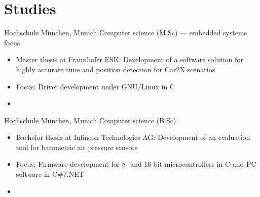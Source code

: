 \documentclass[%
               doublesided,
               paper=a4,
               fontsize=10pt
              ]{my-resume}
\begin{document}
{    \section[\faMortarBoard]{Studies}
        {Hochschule München, Munich}
        {Computer science (M.Sc) --- embedded systems focus}
        {\begin{itemize}
            \item Master thesis at Fraunhofer ESK: Development of a software solution for highly accurate time and position detection for Car2X scenarios
            \item Focus: Driver development under GNU/Linux in C
            \item[]  
        \end{itemize}}
    
        {Hochschule München, Munich}
        {Computer science (B.Sc)}
        {\begin{itemize}
            \item Bachelor thesis at Infineon Technologies AG: Development of an evaluation tool for barometric air pressure sensors
            \item Focus: Firmware development for 8- and 16-bit microcontrollers in C and PC software in C\#/.NET
            \item[]   
        \end{itemize}}

}
\makebody
\clearpage
\end{document}
